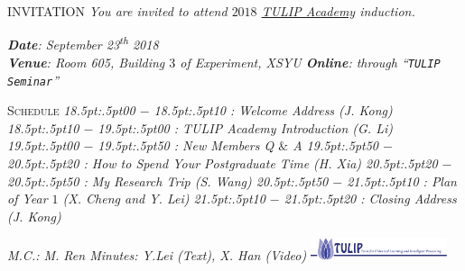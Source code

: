 \documentclass{article}
\begin{document}
%

\obeylines%

{ INVITATION}
\bigbreak
\textit{%
  You are invited to attend $2018$ \href{http://www.tulip.org.au}{TULIP Academy} induction.
}

\vspace{4pt}

{\scshape }
\textit{%
\textbf{Date}:  September 23\/\rlap{,}\textsuperscript{th} 2018 \\ %
\textbf{Venue}: Room 605, Building $3$ of Experiment, XSYU
\textbf{Online}: through ``\texttt{TULIP Seminar}''
}

\medbreak
{\scshape  Schedule}
\textit{%
\footnotesize{
  18\kern.5pt:\kern.5pt00 $-$ 18\kern.5pt:\kern.5pt10 : Welcome Address (J. Kong)
  18\kern.5pt:\kern.5pt10 $-$ 19\kern.5pt:\kern.5pt00 : TULIP Academy Introduction (G. Li)
  19\kern.5pt:\kern.5pt00 $-$ 19\kern.5pt:\kern.5pt50 : New Members Q $\&$ A
  19\kern.5pt:\kern.5pt50 $-$ 20\kern.5pt:\kern.5pt20 : How to Spend Your Postgraduate Time (H. Xia)
  20\kern.5pt:\kern.5pt20 $-$ 20\kern.5pt:\kern.5pt50 : My Research Trip (S. Wang)
  20\kern.5pt:\kern.5pt50 $-$ 21\kern.5pt:\kern.5pt10 : Plan of Year $1$ (X. Cheng and Y. Lei)
  21\kern.5pt:\kern.5pt10 $-$ 21\kern.5pt:\kern.5pt20 : Closing Address (J. Kong)}
}

\medbreak
{\scshape }
\textit{%
\tiny{
  M.C.: M. Ren
  Minutes: Y.Lei (Text), X. Han (Video)
  }
\vspace{0.8pt}
\includegraphics[width=4cm]{logos/tulip-wordmark.eps}
}
\end{document}

